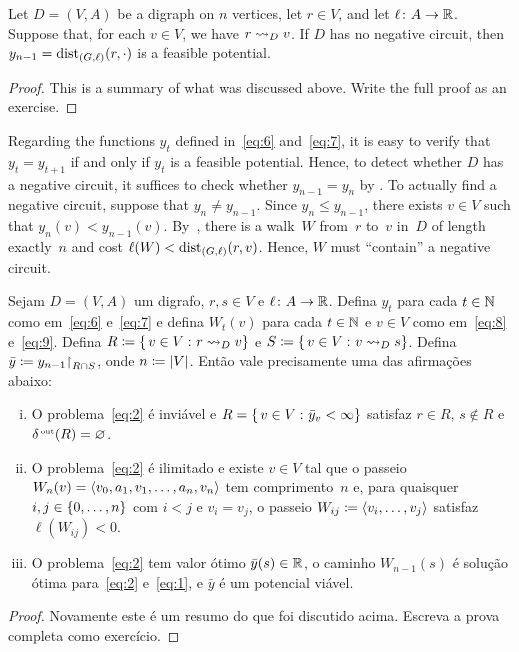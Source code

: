 \documentclass[10pt,reqno]{amsart}
\begin{document}
\begin{corollary}
  \label{cor:1}
  Let \(D = (V,A)\) be a digraph on \(n\) vertices, let \(r \in V\),
  and let \(\ell \colon A \to \mathbb{R}\).  Suppose that, for each
  \(v \in V\), we have \(r \rightsquigarrow_D v\).  If \(D\) has no negative
  circuit, then \(y_{n-1} = \operatorname{dist}_{(G,\ell)}(r,\cdot)\) is a feasible
  potential.
\end{corollary}
\begin{proof}
  This is a summary of what was discussed above.  Write the full proof
  as an exercise.
\end{proof}

Regarding the functions \(y_t\) defined in~\eqref{eq:6}
and~\eqref{eq:7}, it is easy to verify that \(y_{t} = y_{t+1}\) if and
only if \(y_t\) is a feasible potential.  Hence, to detect whether
\(D\) has a negative circuit, it suffices to check whether
\(y_{n-1} = y_n\) by .  To actually find a negative
circuit, suppose that \(y_n \neq y_{n-1}\).  Since
\(y_n \leq y_{n-1}\), there exists \(v \in V\) such that
\(y_n(v) < y_{n-1}(v)\).  By~, there is a walk~\(W\)
from~\(r\) to~\(v\) in~\(D\) of length exactly~\(n\) and cost
\(\ell(W) < \operatorname{dist}_{(G,\ell)}(r,v)\).  Hence, \(W\) must ``contain'' a
negative circuit.

\begin{theorem}
  Sejam \(D = (V,A)\) um digrafo, \(r,s \in V\) e
  \(\ell \colon A \to \mathbb{R}\).  Defina \(y_t\) para cada
  \(t \in \mathbb{N}\) como em~\eqref{eq:6} e~\eqref{eq:7} e defina
  \(W_t(v)\) para cada \(t \in \mathbb{N}\) e \(v \in V\) como
  em~\eqref{eq:8} e~\eqref{eq:9}.  Defina
  \(R \coloneqq \{\,{v \in V}\,\colon{r \rightsquigarrow_D v}\}\) e
  \(S \coloneqq \{\,{v \in V}\,\colon{v \rightsquigarrow_D s}\}\).  Defina
  \(\bar{y} \coloneqq y_{n-1}\mathord{\restriction}_{R \cap S}\), onde
  \(n \coloneqq \lvert V\rvert\).  Então vale precisamente uma das
  afirmações abaixo:
  \begin{enumerate}[(i)]
  \item O problema~\eqref{eq:2} é inviável e
    \(R = \{\,{v \in V}\,\colon{\bar{y}_v < \infty}\}\) satisfaz \(r \in R\),
    \(s \not\in R\) e \(\delta_{}^{\scriptscriptstyle \rm\, out}(R) = \varnothing\).
  \item O problema~\eqref{eq:2} é ilimitado e existe \(v \in V\) tal
    que o passeio \(W_n(v) = \langle v_0,a_1,v_1,\dotsc,a_n,v_n\rangle\) tem
    comprimento~\(n\) e, para quaisquer \(i,j \in \{0,\dotsc,n\}\)
    com \(i < j\) e \(v_i = v_j\), o passeio
    \(W_{ij} \coloneqq \langle v_i,\dotsc,v_j\rangle\) satisfaz
    \(\ell(W_{ij}) < 0\).
  \item O problema~\eqref{eq:2} tem valor ótimo
    \(\bar{y}(s) \in \mathbb{R}\), o caminho \(W_{n-1}(s)\) é solução
    ótima para~\eqref{eq:2} e~\eqref{eq:1}, e \(\bar{y}\) é um
    potencial viável.
  \end{enumerate}
\end{theorem}
\begin{proof}
  Novamente este é um resumo do que foi discutido acima.  Escreva a
  prova completa como exercício.
\end{proof}

\nocite{CookCPS98a,Schrijver03a}

\begingroup
\printbibliography
\endgroup
\end{document}
